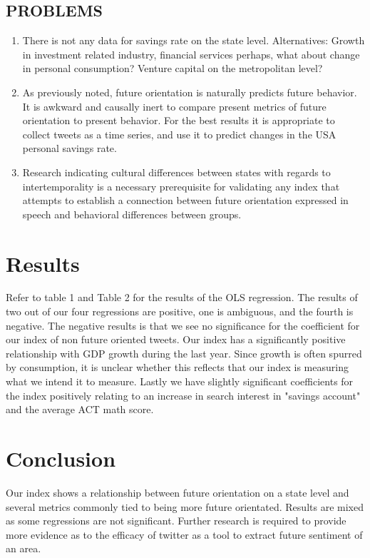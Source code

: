 \documentclass{article}
\begin{document}
\subsection{PROBLEMS}

\begin{enumerate}
    \item There is not any data for savings rate on the state level. Alternatives: Growth in investment related industry, financial services perhaps, what about change in personal consumption? Venture capital on the metropolitan level? 
    \item As previously noted, future orientation is naturally predicts future behavior. It is awkward and causally inert to compare present metrics of future orientation to present behavior. For the best results it is appropriate to collect tweets as a time series, and use it to predict changes in the USA personal savings rate. 
    \item Research indicating cultural differences between states with regards to intertemporality is a necessary prerequisite for validating any index that attempts to establish a connection between future orientation expressed in speech and behavioral differences between groups.
  
\end{enumerate}

\section{Results}
Refer to table 1 and Table 2 for the results of the OLS regression. The results of two out of our four regressions are positive, one is ambiguous, and the fourth is negative. The negative results is that we see no significance for the coefficient for our index of non future oriented tweets. Our index has a significantly positive relationship with GDP growth during the last year. Since growth is often spurred by consumption, it is unclear whether this reflects that our index is measuring what we intend it to measure. Lastly we have slightly significant coefficients for the index positively relating to an increase in search interest in "savings account" and the average ACT math score. 

\section{Conclusion}

Our index shows a relationship between future orientation on a state level and several metrics commonly tied to being more future orientated. Results are mixed as some regressions are not significant. Further research is required to provide more evidence as to the efficacy of twitter as a tool to extract future sentiment of an area. 
\end{document}
